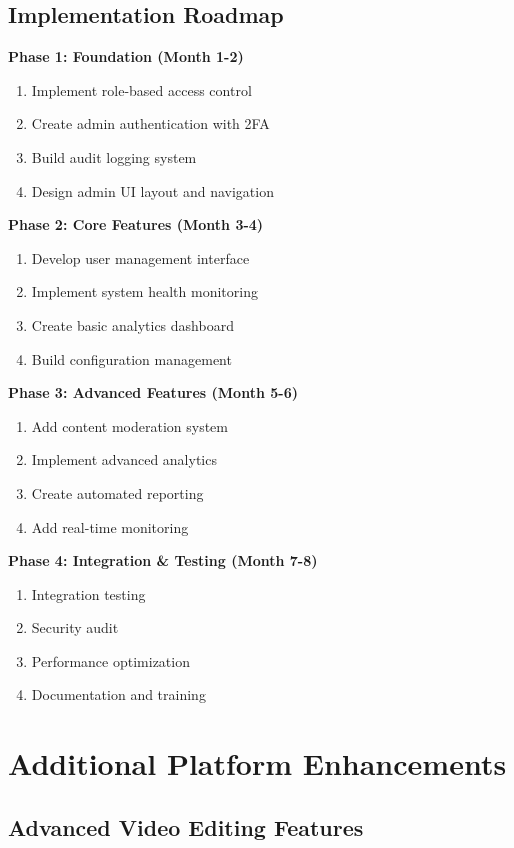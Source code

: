 \subsection{Implementation Roadmap}

\textbf{Phase 1: Foundation (Month 1-2)}
\begin{enumerate}
    \item Implement role-based access control
    \item Create admin authentication with 2FA
    \item Build audit logging system
    \item Design admin UI layout and navigation
\end{enumerate}

\textbf{Phase 2: Core Features (Month 3-4)}
\begin{enumerate}
    \item Develop user management interface
    \item Implement system health monitoring
    \item Create basic analytics dashboard
    \item Build configuration management
\end{enumerate}

\textbf{Phase 3: Advanced Features (Month 5-6)}
\begin{enumerate}
    \item Add content moderation system
    \item Implement advanced analytics
    \item Create automated reporting
    \item Add real-time monitoring
\end{enumerate}

\textbf{Phase 4: Integration \& Testing (Month 7-8)}
\begin{enumerate}
    \item Integration testing
    \item Security audit
    \item Performance optimization
    \item Documentation and training
\end{enumerate}

\section{Additional Platform Enhancements}

\subsection{Advanced Video Editing Features}

